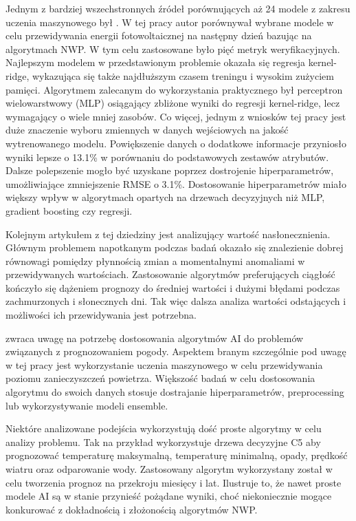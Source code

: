 Jednym z bardziej wszechstronnych źródeł porównujących aż 24 modele z zakresu
uczenia maszynowego był \cite{comparison-of-ml-methods}.
W tej pracy autor porównywał wybrane modele w celu przewidywania energii fotowoltaicznej
na następny dzień bazując na algorytmach NWP. W tym celu zastosowane było pięć metryk
weryfikacyjnych. Najlepszym modelem w przedstawionym problemie okazała się regresja 
kernel-ridge, wykazująca się także najdłuższym czasem treningu i wysokim zużyciem pamięci.
Algorytmem zalecanym do wykorzystania praktycznego był perceptron wielowarstwowy (MLP)
osiągający zbliżone wyniki do regresji kernel-ridge, lecz wymagający o wiele mniej zasobów.
Co więcej, jednym z wniosków tej pracy jest duże znaczenie wyboru zmiennych w danych wejściowych
na jakość wytrenowanego modelu. Powiększenie danych o dodatkowe informacje przyniosło
wyniki lepsze o 13.1\% w porównaniu do podstawowych zestawów atrybutów. Dalsze polepszenie
mogło być uzyskane poprzez dostrojenie hiperparametrów, umożliwiające zmniejszenie 
RMSE o 3.1\%. Dostosowanie hiperparametrów miało większy wpływ w algorytmach opartych
na drzewach decyzyjnych niż MLP, gradient boosting czy regresji. 

Kolejnym artykułem z tej dziedziny jest \cite{coupling-data-science}
analizujący wartość nasłonecznienia. Głównym problemem napotkanym podczas
badań okazało się znalezienie dobrej równowagi pomiędzy płynnością zmian a 
momentalnymi anomaliami w przewidywanych wartościach. Zastosowanie algorytmów
preferujących ciągłość kończyło się dążeniem prognozy do średniej wartości i 
dużymi błędami podczas zachmurzonych i słonecznych dni. Tak więc dalsza analiza 
wartości odstających i możliwości ich przewidywania jest potrzebna.

\cite{development-and-application-of-ml-in}
zwraca uwagę na potrzebę dostosowania algorytmów AI do problemów związanych z prognozowaniem
pogody. Aspektem branym szczególnie pod uwagę w tej pracy jest wykorzystanie uczenia
maszynowego w celu przewidywania poziomu zanieczyszczeń powietrza. Większość
badań w celu dostosowania algorytmu do swoich danych stosuje dostrajanie hiperparametrów,
preprocessing lub wykorzystywanie modeli ensemble. 

Niektóre analizowane podejścia wykorzystują dość proste algorytmy w celu analizy
problemu. Tak na przykład 
\cite{weather-forecast-prediction-data-mining} wykorzystuje drzewa decyzyjne C5 
aby prognozować temperaturę maksymalną, temperaturę minimalną, opady, prędkość wiatru
oraz odparowanie wody. Zastosowany algorytm wykorzystany został w celu tworzenia prognoz
na przekroju miesięcy i lat. Ilustruje to, że nawet proste modele AI są w stanie 
przynieść pożądane wyniki, choć niekoniecznie mogące konkurować z dokładnością i 
złożonością algorytmów NWP.

